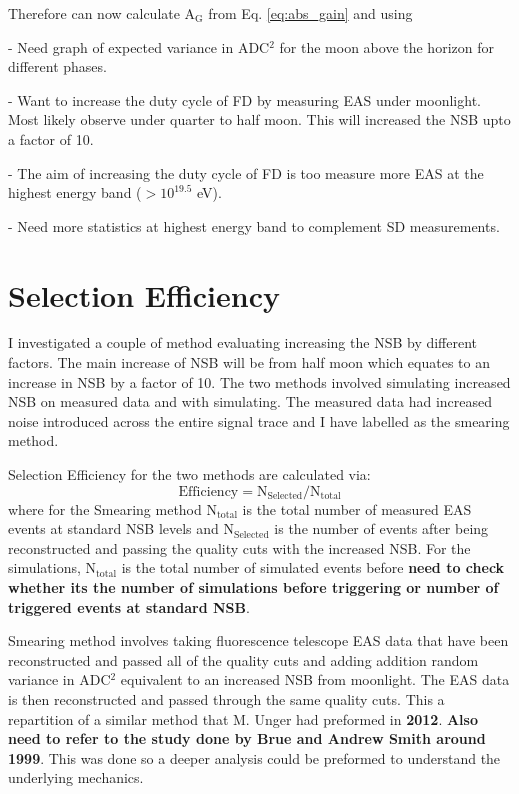 Therefore can now calculate A$_{\mathrm{G}}$ from Eq. \ref{eq:abs_gain} and using 

- Need graph of expected variance in ADC$^2$ for the moon above the horizon for different phases.

- Want to increase the duty cycle of FD by measuring EAS under moonlight. Most likely observe under quarter to half moon. This will increased the NSB upto a factor of 10.

- The aim of increasing the duty cycle of FD is too measure more EAS at the highest energy band ($> 10^{19.5}$ eV).

- Need more statistics at highest energy band to complement SD measurements.


\section{Selection Efficiency}

I investigated a couple of method evaluating increasing the NSB by different factors. The main increase of NSB will be from half moon which equates to an increase in NSB by a factor of 10. The two methods involved simulating increased NSB on measured data and with simulating. The measured data had increased noise introduced across the entire signal trace and I have labelled as the smearing method.

Selection Efficiency for the two methods are calculated via:
\begin{equation}
\mathrm{Efficiency} = \mathrm{N}_{\mathrm{Selected}} / \mathrm{N}_{\mathrm{total}}
\end{equation}
where for the Smearing method N$_{\mathrm{total}}$ is the total number of measured EAS events at standard NSB levels and N$_{\mathrm{Selected}}$ is the number of events after being reconstructed and passing the quality cuts with the increased NSB. For the simulations, N$_{\mathrm{total}}$ is the total number of simulated events before \textbf{need to check whether its the number of simulations before triggering or number of triggered events at standard NSB}.

Smearing method involves taking fluorescence telescope EAS data that have been reconstructed and passed all of the quality cuts and adding addition random variance in ADC$^2$ equivalent to an increased NSB from moonlight. The EAS data is then reconstructed and passed through the same quality cuts. This a repartition of a similar method that M. Unger had preformed in \textbf{2012}. \textbf{Also need to refer to the study done by Brue and Andrew Smith around 1999}. This was done so a deeper analysis could be preformed to understand the underlying mechanics.

